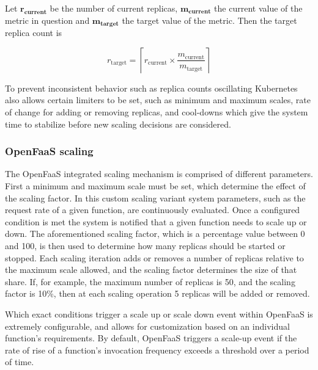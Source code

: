 Let $\mathbf{r_{\text{current}}}$ be the number of current replicas, $\mathbf{m_{\text{current}}}$ the current value of the metric in question and $\mathbf{m_{\text{target}}}$ the target value of the metric.
Then the target replica count is

\[ r_{\text{target}} = \left \lceil r_{\text{current}} \times \frac{m_{\text{current}}}{m_{\text{target}}} \right \rceil\]

To prevent inconsistent behavior such as replica counts oscillating Kubernetes also allows certain limiters to be set, such as minimum and maximum scales, rate of change for adding or removing replicas, and cool-downs which give the system time to stabilize before new scaling decisions are considered\cite{kubernetes-hpa}.

\subsubsection{OpenFaaS scaling}
The OpenFaaS integrated scaling mechanism is comprised of different parameters.
First a minimum and maximum scale must be set, which determine the effect of the scaling factor.
In this custom scaling variant system parameters, such as the request rate of a given function, are continuously evaluated.
Once a configured condition is met the system is notified that a given function needs to scale up or down.
The aforementioned scaling factor, which is a percentage value between 0 and 100, is then used to determine how many replicas should be started or stopped\cite{openfaas-autoscaling}.
Each scaling iteration adds or removes a number of replicas relative to the maximum scale allowed, and the scaling factor determines the size of that share.
If, for example, the maximum number of replicas is 50, and the scaling factor is 10\%, then at each scaling operation 5 replicas will be added or removed.

Which exact conditions trigger a scale up or scale down event within OpenFaaS is extremely configurable, and allows for customization based on an individual function's requirements.
By default, OpenFaaS triggers a scale-up event if the rate of rise of a function's invocation frequency exceeds a threshold over a period of time.



